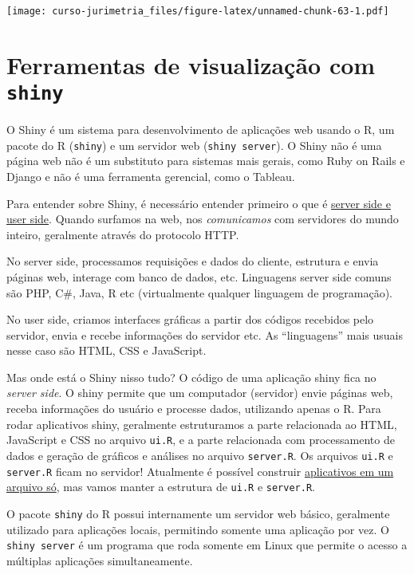 \documentclass[]{book}
\begin{document}
\texttt{[image: curso-jurimetria\_files/figure-latex/unnamed-chunk-63-1.pdf]}

\section{\texorpdfstring{Ferramentas de visualização com
\texttt{shiny}}{Ferramentas de visualização com shiny}}\label{ferramentas-de-visualizacao-com-shiny}

O Shiny é um sistema para desenvolvimento de aplicações web usando o R,
um pacote do R (\texttt{shiny}) e um servidor web
(\texttt{shiny\ server}). O Shiny não é uma página web não é um
substituto para sistemas mais gerais, como Ruby on Rails e Django e não
é uma ferramenta gerencial, como o Tableau.

Para entender sobre Shiny, é necessário entender primeiro o que é
\href{http://programmers.stackexchange.com/a/171210}{server side e user
side}. Quando surfamos na web, nos \emph{comunicamos} com servidores do
mundo inteiro, geralmente através do protocolo HTTP.

No server side, processamos requisições e dados do cliente, estrutura e
envia páginas web, interage com banco de dados, etc. Linguagens server
side comuns são PHP, C\#, Java, R etc (virtualmente qualquer linguagem
de programação).

No user side, criamos interfaces gráficas a partir dos códigos recebidos
pelo servidor, envia e recebe informações do servidor etc. As
``linguagens'' mais usuais nesse caso são HTML, CSS e JavaScript.

Mas onde está o Shiny nisso tudo? O código de uma aplicação shiny fica
no \emph{server side}. O shiny permite que um computador (servidor)
envie páginas web, receba informações do usuário e processe dados,
utilizando apenas o R. Para rodar aplicativos shiny, geralmente
estruturamos a parte relacionada ao HTML, JavaScript e CSS no arquivo
\texttt{ui.R}, e a parte relacionada com processamento de dados e
geração de gráficos e análises no arquivo \texttt{server.R}. Os arquivos
\texttt{ui.R} e \texttt{server.R} ficam no servidor! Atualmente é
possível construir
\href{http://shiny.rstudio.com/articles/single-file.html}{aplicativos em
um arquivo só}, mas vamos manter a estrutura de \texttt{ui.R} e
\texttt{server.R}.

O pacote \texttt{shiny} do R possui internamente um servidor web básico,
geralmente utilizado para aplicações locais, permitindo somente uma
aplicação por vez. O \texttt{shiny\ server} é um programa que roda
somente em Linux que permite o acesso a múltiplas aplicações
simultaneamente.
\end{document}

